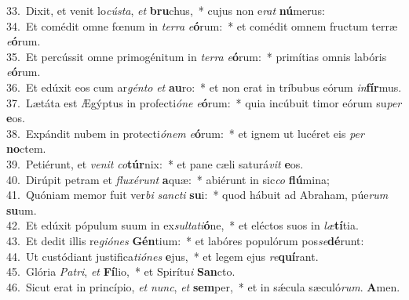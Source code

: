 {33.~}Dixit, et venit lo\textit{cú}\textit{sta}, \textit{et} \textbf{bru}chus,~* cujus non e\textit{rat} \textbf{nú}merus:\\
{34.~}Et comédit omne fœnum in \textit{ter}\textit{ra} \textit{e}\textbf{ó}rum:~* et comédit omnem fructum terræ \textit{e}\textbf{ó}rum.\\
{35.~}Et percússit omne primogénitum in \textit{ter}\textit{ra} \textit{e}\textbf{ó}rum:~* primítias omnis labóris \textit{e}\textbf{ó}rum.\\
{36.~}Et edúxit eos cum ar\textit{gén}\textit{to} \textit{et} \textbf{au}ro:~* et non erat in tríbubus eórum \textit{in}\textbf{fír}mus.\\
{37.~}Lætáta est Ægýptus in profecti\textit{ó}\textit{ne} \textit{e}\textbf{ó}rum:~* quia incúbuit timor eórum su\textit{per} \textbf{e}os.\\
{38.~}Expándit nubem in protecti\textit{ó}\textit{nem} \textit{e}\textbf{ó}rum:~* et ignem ut lucéret eis \textit{per} \textbf{no}ctem.\\
{39.~}Petiérunt, et \textit{ve}\textit{nit} \textit{co}\textbf{túr}nix:~* et pane cæli saturá\textit{vit} \textbf{e}os.\\
{40.~}Dirúpit petram et \textit{flu}\textit{xé}\textit{runt} \textbf{a}quæ:~* abiérunt in sic\textit{co} \textbf{flú}mina;\\
{41.~}Quóniam memor fuit ver\textit{bi} \textit{san}\textit{cti} \textbf{su}i:~* quod hábuit ad Abraham, púe\textit{rum} \textbf{su}um.\\
{42.~}Et edúxit pópulum suum in ex\textit{sul}\textit{ta}\textit{ti}\textbf{ó}ne,~* et eléctos suos in \textit{læ}\textbf{tí}tia.\\
{43.~}Et dedit illis re\textit{gi}\textit{ó}\textit{nes} \textbf{Gén}tium:~* et labóres populórum pos\textit{se}\textbf{dé}runt:\\
{44.~}Ut custódiant justifica\textit{ti}\textit{ó}\textit{nes} \textbf{e}jus,~* et legem ejus \textit{re}\textbf{quí}rant.\\
{45.~}Glória \textit{Pa}\textit{tri}, \textit{et} \textbf{Fí}lio,~* et Spirítu\textit{i} \textbf{San}cto.\\
{46.~}Sicut erat in princípio, \textit{et} \textit{nunc}, \textit{et} \textbf{sem}per,~* et in sǽcula sæculó\textit{rum}. \textbf{A}men.\\
